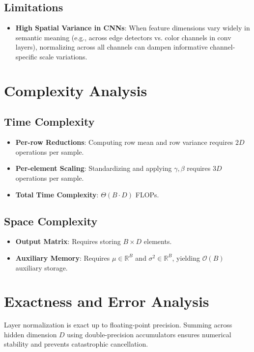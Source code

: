 \documentclass[11pt,a4paper]{article}
\theoremstyle{definition}
\begin{document}
\subsection{Limitations}
\begin{itemize}
    \item \textbf{High Spatial Variance in CNNs}: When feature dimensions vary widely in semantic meaning (e.g., across edge detectors vs. color channels in conv layers), normalizing across all channels can dampen informative channel-specific scale variations.
\end{itemize}

\section{Complexity Analysis}

\subsection{Time Complexity}
\begin{itemize}
    \item \textbf{Per-row Reductions}: Computing row mean and row variance requires $2D$ operations per sample.
    \item \textbf{Per-element Scaling}: Standardizing and applying $\gamma, \beta$ requires $3D$ operations per sample.
    \item \textbf{Total Time Complexity}: $\Theta(B \cdot D)$ FLOPs.
\end{itemize}

\subsection{Space Complexity}
\begin{itemize}
    \item \textbf{Output Matrix}: Requires storing $B \times D$ elements.
    \item \textbf{Auxiliary Memory}: Requires $\mu \in \mathbb{R}^B$ and $\sigma^2 \in \mathbb{R}^B$, yielding $\mathcal{O}(B)$ auxiliary storage.
\end{itemize}

\section{Exactness and Error Analysis}

Layer normalization is exact up to floating-point precision. Summing across hidden dimension $D$ using double-precision accumulators ensures numerical stability and prevents catastrophic cancellation.
\end{document}
